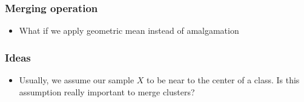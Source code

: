 \begin{frame}
\frametitle{Merging operation}

\begin{itemize}
\item What if we apply geometric mean instead of amalgamation
\end{itemize}
\end{frame}

\begin{frame}
\frametitle{Ideas}
\begin{itemize}
\item Usually, we assume our sample $X$ to be near to the center of a class. Is this assumption really important to merge clusters?
\end{itemize}
\end{frame}